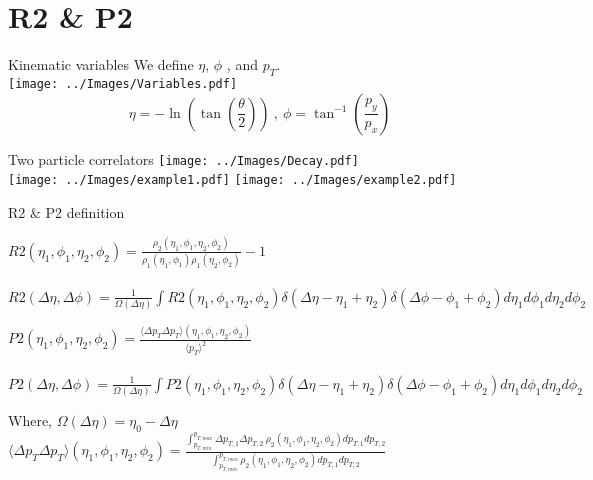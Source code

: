 \documentclass{beamer}
\begin{document}
\section{R2 \& P2}
\begin{frame}{Kinematic variables}
	We define $\eta$, $\phi$ , and $p_T$.\\
	\centering
	\texttt{[image: ../Images/Variables.pdf]}
	\[\eta=-\ln\left(\tan\left(\frac{\theta}{2}\right)\right)\ , \ \phi=\tan^{-1}\left(\frac{p_y}{p_x}\right)\]
\end{frame}
\begin{frame}{Two particle correlators}
	\centering
	\texttt{[image: ../Images/Decay.pdf]}\\
	\texttt{[image: ../Images/example1.pdf]} \qquad \texttt{[image: ../Images/example2.pdf]}
\end{frame}
\begin{frame}{R2 \& P2 definition}
	\begin{definition}
		$R2(\eta_1,\phi_1,\eta_2,\phi_2)=\frac{\rho_2(\eta_1,\phi_1,\eta_2,\phi_2)}{\rho_1(\eta_1,\phi_1)\rho_1(\eta_2,\phi_2)}-1$\\~\\
		{\tiny$R2(\Delta\eta,\Delta\phi)=\frac{1}{\Omega(\Delta\eta)}\int R2(\eta_1,\phi_1,\eta_2,\phi_2)\delta(\Delta\eta-\eta_1+\eta_2)\delta(\Delta\phi-\phi_1+\phi_2)d\eta_1 d\phi_1 d\eta_2 d\phi_2$}
	\end{definition}
	\begin{definition}
		$P2(\eta_1,\phi_1,\eta_2,\phi_2)=\frac{\langle\Delta p_T \Delta p_T \rangle(\eta_1,\phi_1,\eta_2,\phi_2)}{\langle p_T\rangle^2}$\\~\\
		{\tiny$P2(\Delta\eta,\Delta\phi)=\frac{1}{\Omega(\Delta\eta)}\int P2(\eta_1,\phi_1,\eta_2,\phi_2)\delta(\Delta\eta-\eta_1+\eta_2)\delta(\Delta\phi-\phi_1+\phi_2)d\eta_1 d\phi_1 d\eta_2 d\phi_2$}
	\end{definition}
	\begin{block}{Where,}
		$\Omega(\Delta\eta)=\eta_0-\Delta\eta$\\
		$\langle\Delta p_T \Delta p_T\rangle(\eta_1,\phi_1,\eta_2,\phi_2)=\frac{\int_{p_{T,min}}^{p_{T,max}}\Delta p_{T,1}\Delta p_{T,2} \ \rho_2(\eta_1,\phi_1,\eta_2,\phi_2)d p_{T,1}d p_{T,2}}{\int_{p_{T,min}}^{p_{T,max}}\rho_2(\eta_1,\phi_1,\eta_2,\phi_2)d p_{T,1}d p_{T,2}}$
	\end{block}
\end{frame}
\end{document}
